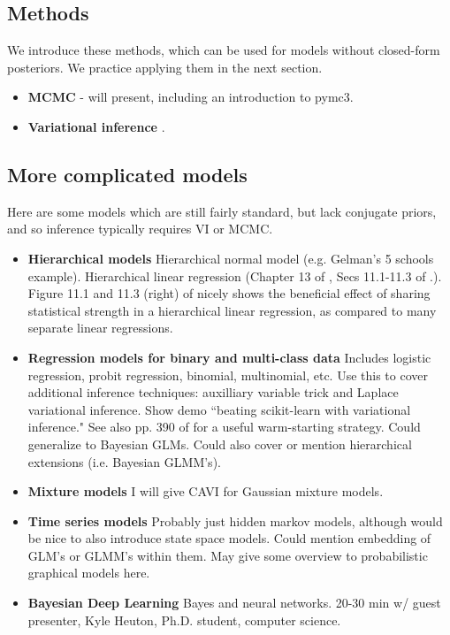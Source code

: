 \documentclass{article} %
\begin{document}
\subsection{Methods}

We introduce these methods,  which can be used for models without closed-form posteriors.  We practice applying them in the next section.  

\begin{itemize}
\item \textbf{MCMC} -  will present,  including an introduction to pymc3. 
\item \textbf{Variational inference} \cite{wojnowiczXXXXfoundations}.
\end{itemize} 

\subsection{More complicated models} \label{sec:more_complicated_models}

Here are some models which are still fairly standard,  but lack conjugate priors,  and so inference typically requires VI or MCMC.     

\begin{itemize}
\item \textbf{Hierarchical models}  Hierarchical normal model (e.g. Gelman's 5 schools example).   Hierarchical linear regression (Chapter 13 of \cite{gelman2013bayesian},   Secs 11.1-11.3 of \cite{hoff2009first}.).  Figure 11.1 and 11.3 (right) of \cite{hoff2009first} nicely shows the beneficial effect of sharing statistical strength in a hierarchical linear regression,  as compared to many separate linear regressions.
\item \textbf{Regression models for binary and multi-class data} Includes logistic regression, probit regression,  binomial,  multinomial,  etc.    Use this to cover additional inference techniques:  auxilliary variable trick and Laplace variational inference.    Show demo ``beating scikit-learn with variational inference."   See also pp.  390 of \cite{hoff2009first} for a useful warm-starting strategy.   Could generalize to Bayesian GLMs.   Could also cover or mention hierarchical extensions (i.e.  Bayesian GLMM's).   
\item \textbf{Mixture models} I will give CAVI for Gaussian mixture models. 
\item \textbf{Time series models}  Probably just hidden markov models,  although would be nice to also introduce state space models.    Could mention embedding of GLM's or GLMM's within them.   May give some overview to probabilistic graphical models here.  
\item \textbf{Bayesian Deep Learning}  Bayes and neural networks.   20-30 min w/ guest presenter,  Kyle Heuton,  Ph.D.  student,  computer science.
\end{itemize}
\end{document}
